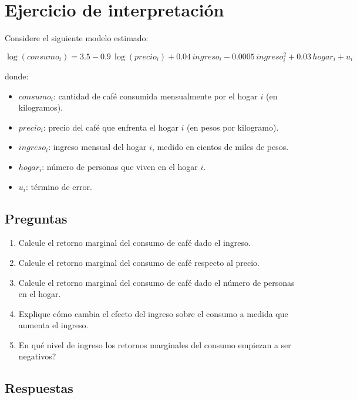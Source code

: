 \documentclass[12pt]{article}
\begin{document}
\section*{Ejercicio de interpretación}

Considere el siguiente modelo estimado:

\[
\log(consumo_i)= 3.5 - 0.9\,\log(precio_i) + 0.04\,ingreso_i - 0.0005\,ingreso_i^2 + 0.03\,hogar_i + u_i
\]

donde:

\begin{itemize}
    \item $consumo_i$: cantidad de café consumida mensualmente por el hogar $i$ (en kilogramos).
    \item $precio_i$: precio del café que enfrenta el hogar $i$ (en pesos por kilogramo).
    \item $ingreso_i$: ingreso mensual del hogar $i$, medido en cientos de miles de pesos.
    \item $hogar_i$: número de personas que viven en el hogar $i$.
    \item $u_i$: término de error.
\end{itemize}

\subsection*{Preguntas}

\begin{enumerate}
    \item[a)] Calcule el retorno marginal del consumo de café dado el ingreso.
    \item[b)] Calcule el retorno marginal del consumo de café respecto al precio.
    \item[c)] Calcule el retorno marginal del consumo de café dado el número de personas en el hogar.
    \item[d)] Explique cómo cambia el efecto del ingreso sobre el consumo a medida que aumenta el ingreso.
    \item[e)] \textquestiondown En qué nivel de ingreso los retornos marginales del consumo empiezan a ser negativos?
\end{enumerate}

\subsection*{Respuestas}
\end{document}
